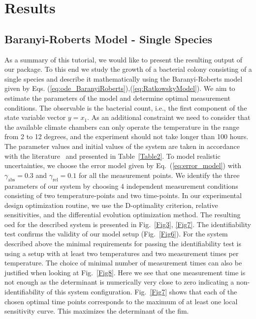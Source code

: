 \documentclass[graybox]{svmult}
\begin{document}
\section{Results}
\subsection{Baranyi-Roberts Model - Single Species}
As a summary of this tutorial, we would like to present the resulting output of our package.
To this end we study the growth of a bacterial colony consisting of a single species and describe it mathematically using the Baranyi-Roberts model given by Eqs. (\ref{eq:ode_BaranyiRoberts}),(\ref{eq:RatkowskyModel}).
We aim to estimate the parameters of the model and determine optimal measurement conditions.
The observable is the bacterial count, i.e., the first component of the state variable vector $y = x_1$.
As an additional constraint we need to consider that the available climate chambers can only operate the temperature in the range from 2 to 12 degrees, and the experiment should not take longer than 100 hours.
The parameter values and initial values of the system are taken in accordance with the literature~\cite{gospavic_mathematical_2008} and presented in Table~\ref{Table2}.
%
To model realistic uncertainties, we choose the error model given by Eq.~(\ref{eq:error_model}) with $\gamma_\text{abs}=0.3$ and $\gamma_\text{rel}=0.1$ for all the measurement points.
We identify the three parameters of our system by choosing 4 independent measurement conditions consisting of two temperature-points and two time-points.
In our experimental design optimization routine, we use the D-optimality criterion, relative sensitivities, and the differential evolution optimization method.
The resulting \ac{oed} for the described system is presented in Fig.~\ref{Fig3}, \ref{Fig7}.
The identifiability test confirms the validity of our model setup (Fig.~\ref{Fig6}).
%
%
For the system described above the minimal requirements for passing the identifiability test is using a setup with at least two temperatures and two measurement times per temperature.
The choice of minimal number of measurement times can also be justified when looking at Fig.~\ref{Fig8}.
Here we see that one measurement time is not enough as the determinant is numerically very close to zero indicating a non-identifiability of this system configuration.
%
%
Fig.~\ref{Fig7} shows that each of the chosen optimal time points corresponds to the maximum of at least one local sensitivity curve.
This maximizes the determinant of the \acl{fim}.
%
%
%
\end{document}
